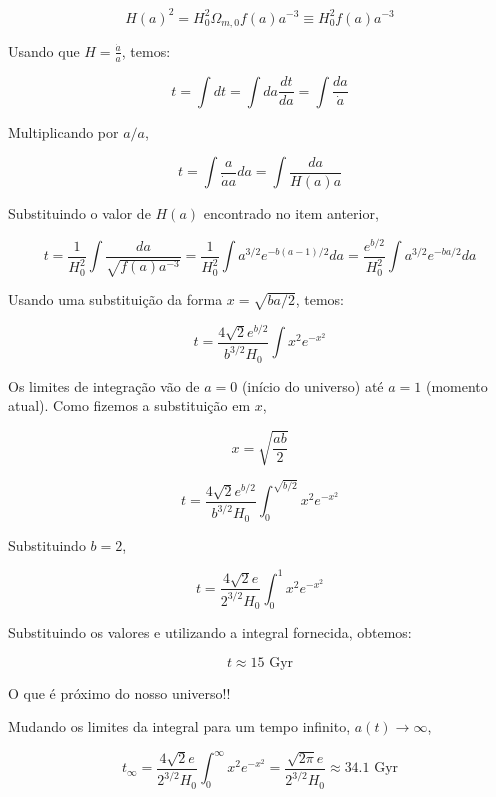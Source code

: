 \documentclass[11pt]{article}
\begin{document}
\begin{pproblem}
\begin{pssolution*}{}{ }
\begin{alternativas}
        \[\boxed{H(a)^2 = H_0^2 \Omega_{m,0} f(a) a^{-3} \equiv H_0^2 f(a) a^{-3}}\]

        \item Usando que \(H = \frac{\dot{a}}{a}\), temos:

        \[t = \int dt = \int da \frac{dt}{da} = \int \frac{da}{\dot{a}}\]

        Multiplicando por \(a/a\),

        \[t = \int \frac{a}{\dot{a}a} da = \int \frac{da}{H(a) a}\]

        Substituindo o valor de \(H(a)\) encontrado no item anterior,

        \[t = \frac{1}{H_0^2} \int \frac{da}{\sqrt{f(a) a^{-3}}} = \frac{1}{H_0^2} \int a^{3/2} e^{-b(a-1)/2} da = \frac{e^{b/2}}{H_0^2} \int a^{3/2} e^{-b a/2} da\]
        
        Usando uma substituição da forma \(x = \sqrt{ba/2}\), temos:

        \[t = \frac{4\sqrt{2} e^{b/2}}{b^{3/2} H_0} \int x^2 e^{-x^2}\]

        Os limites de integração vão de \(a=0\) (início do universo) até \(a=1\) (momento atual). Como fizemos a substituição em \(x\),

        \[x = \sqrt{\frac{ab}{2}}\]

        \[t = \frac{4\sqrt{2} e^{b/2}}{b^{3/2} H_0} \int_0^{\sqrt{b/2}} x^2 e^{-x^2}\]

        Substituindo \(b=2\),

        \[t = \frac{4\sqrt{2} e}{2^{3/2} H_0} \int_0^1 x^2 e^{-x^2}\]

        Substituindo os valores e utilizando a integral fornecida, obtemos:

        \[\boxed{t \approx 15 \text{ Gyr}}\]

        O que é próximo do nosso universo!!

        \item Mudando os limites da integral para um tempo infinito, \(a(t) \rightarrow \infty\),

        \[\boxed{t_\infty = \frac{4\sqrt{2} e}{2^{3/2} H_0} \int_0^{\infty} x^2 e^{-x^2} = \frac{\sqrt{2\pi} e}{2^{3/2} H_0} \approx 34.1 \text{ Gyr}}\]

    \end{alternativas}
\end{pssolution*}
\end{pproblem}
\end{document}
